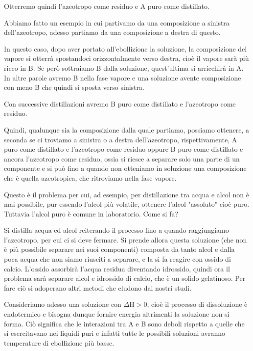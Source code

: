 Otterremo quindi l'azeotropo come residuo e A puro come distillato.

Abbiamo fatto un esempio in cui partivamo da una composizione a sinistra dell'azeotropo, adesso partiamo da una composizione a destra di questo.

In questo caso, dopo aver portato all'ebollizione la soluzione, la composizione del vapore si otterrà spostandoci orizzontalmente verso destra, cioè il vapore sarà più ricco in B. Se però sottraiamo B dalla soluzione, quest'ultima si arricchirà in A. In altre parole avremo B nella fase vapore e una soluzione avente composizione con meno B che quindi si sposta verso sinistra.

Con successive distillazioni avremo B puro come distillato e l'azeotropo come residuo.

Quindi, qualunque sia la composizione dalla quale partiamo, possiamo ottenere, a seconda se ci troviamo a sinistra o a destra dell'azeotropo, rispettivamente, A puro come distillato e l'azeotropo come residuo oppure B puro come distillato e ancora l'azeotropo come residuo, ossia si riesce a separare solo una parte di un componente e si può fino a quando non otteniamo in soluzione una composizione che è quella azeotropica, che ritroviamo nella fase vapore.

Questo è il problema per cui, ad esempio, per distillazione tra acqua e alcol non è mai possibile, pur essendo l'alcol più volatile, ottenere l'alcol "assoluto" cioè puro. Tuttavia l'alcol puro è comune in laboratorio. Come si fa?

Si distilla acqua ed alcol reiterando il processo fino a quando raggiungiamo l'azeotropo, per cui ci si deve fermare. Si prende allora questa soluzione (che non è più possibile separare nei suoi componenti) composta da tanto alcol e dalla poca acqua che non siamo riusciti a separare, e la si fa reagire con ossido di calcio. L'ossido assorbirà l'acqua residua diventando idrossido, quindi ora il problema sarà separare alcol e idrossido di calcio, che è un solido gelatinoso. Per fare ciò si adoperano altri metodi che eludono dai nostri studi.

\vspace{0.2cm}Consideriamo adesso una soluzione con $\Delta$H$>$0, cioè il processo di dissoluzione è endotermico e bisogna dunque fornire energia altrimenti la soluzione non si forma. Ciò significa che le interazioni tra A e B sono deboli rispetto a quelle che si esercitavano nei liquidi puri e infatti tutte le possibili soluzioni avranno temperature di ebollizione più basse.

